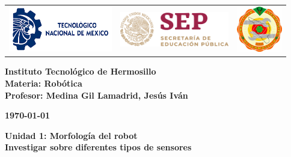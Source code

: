 \begin{titlepage}
	\centering
	\begin{tabular}{@{}p{} p{} p{}@{}}
		\includegraphics[height=2cm]{TECNM.png} & 
		\centering \includegraphics[height=1.5cm]{SEP.png} & 
		\raggedleft \includegraphics[height=2cm]{ith.jpg} \\
	\end{tabular}
	
	\vspace{2em}
	
	\noindent
	\begin{minipage}[t]{0.48\textwidth}
		\raggedright
		\small \textbf{%
			Instituto Tecnológico de Hermosillo\\
			Materia: Robótica\\
			Profesor: Medina Gil Lamadrid, Jesús Iván%
		}
	\end{minipage}%
	\hfill
	\begin{minipage}[t]{0.48\textwidth}
		\raggedleft
		\small \textbf{\today}
	\end{minipage}
	
	\vspace{2em}
	
	{\large \textbf{Unidad 1: Morfología del robot}}\\
	{\Huge \textbf{Investigar sobre diferentes tipos de sensores}}
		
	\vspace{1em}
	

\end{titlepage}
